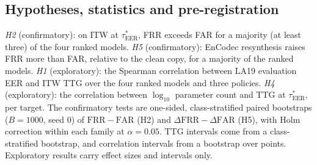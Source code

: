 \documentclass[conference]{IEEEtran}
\newcommand{\frr}{\mathrm{FRR}}
\newcommand{\far}{\mathrm{FAR}}
\newcommand{\tauE}{\tau^{*}_{\mathrm{EER}}}
\begin{document}
\subsection{Hypotheses, statistics and pre-registration}
\label{sec:prereg}
\emph{H2} (confirmatory): on ITW at \(\tauE\), FRR exceeds FAR for a majority
(at least three) of the four ranked models. \emph{H5} (confirmatory): EnCodec
resynthesis raises FRR more than FAR, relative to the clean copy, for a majority
of the ranked models. \emph{H1} (exploratory): the Spearman correlation between
LA19 evaluation EER and ITW TTG over the four ranked models and three policies.
\emph{H4} (exploratory): the correlation between \(\log_{10}\) parameter count
and TTG at \(\tauE\), per target. The confirmatory tests are one-sided,
class-stratified paired bootstraps \cite{koehn04_bootstrap} (\(B=1000\), seed 0)
of \(\frr-\far\) (H2) and \(\Delta\frr-\Delta\far\) (H5), with Holm correction
\cite{holm79_holm} within each family at \(\alpha=0.05\). TTG intervals come from a
class-stratified bootstrap, and correlation intervals from a bootstrap over
points. Exploratory results carry effect sizes and intervals only.
\end{document}
